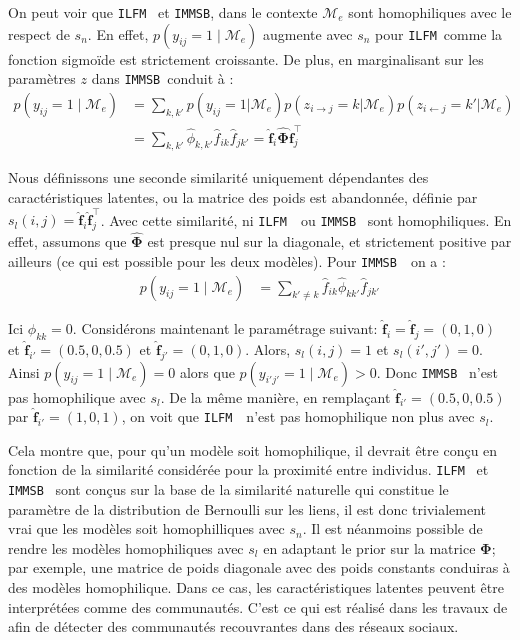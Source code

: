 \documentclass[french]{hermes-journal}
\newcommand{\ilfm}{\texttt{ILFM}}
\newcommand{\immsb}{\texttt{IMMSB}}
\newcommand{\pr}{p}
\newcommand{\M}{\mathcal{M}}
\newcommand{\mat}[1]{\bm{#1}}
\begin{document}
On peut voir que \ilfm~  et \immsb, dans le contexte $\mathcal{M}_e$ sont homophiliques avec le respect de $s_n$. En effet, $\pr(y_{ij}=1 \mid \mathcal{M}_e)$ augmente avec $s_n$  pour  \ilfm\ comme la fonction sigmoïde est strictement croissante. De plus, en marginalisant sur les paramètres $z$ dans \immsb\ conduit à :
\begin{align}
    \pr(y_{ij} =1 \mid \mathcal{M}_e) & = \sum_{k,k'} \pr(y_{ij}=1|\mathcal{M}_e) \pr(z_{i \rightarrow j}=k | \mathcal{M}_e) \pr(z_{i \leftarrow j}=k' | \mathcal{M}_e) \nonumber \\
& = \sum_{k,k'} \hat{\phi}_{k,k'} \hat{f}_{ik} \hat{f}_{jk'} = \mat{\hat{f}}_{i} \mat{\hat{\Phi}} \mat{\hat{f}}_j^\top \nonumber
\end{align}


Nous définissons une seconde similarité uniquement dépendantes des caractéristiques latentes, ou la matrice des poids est abandonnée, définie par $s_l(i,j) = \mat{\hat{f}}_{i} \mat{\hat{f}}_j^\top$. Avec cette similarité, ni \ilfm~ ou \immsb~ sont homophiliques. En effet, assumons que $\mat{\hat{\Phi}}$ est presque nul sur la diagonale, et strictement positive par ailleurs (ce qui est possible pour les deux modèles). Pour \immsb~ on a :
\begin{align*} 
\pr(y_{ij}=1 \mid \M_e) & = \sum_{k' \neq k} \hat{f}_{ik} \hat{\phi}_{kk'} \hat{f}_{jk'}
\end{align*}


Ici $\hat{\phi}_{kk} = 0$.  Considérons maintenant le paramétrage suivant: $\mat{\hat{f}}_i=\mat{\hat{f}}_j=(0,1,0)$ et $\mat{\hat{f}}_{i'}=(0.5,0,0.5)$ et $\mat{\hat{f}}_{j'}=(0,1,0)$. Alors, $s_l(i,j)=1$ et $s_l(i',j')=0$. Ainsi $\pr(y_{ij}=1 \mid \M_e) = 0$ alors que $\pr(y_{i'j'}=1 \mid \M_e) > 0$. Donc \immsb~ n'est pas homophilique avec $s_l$. De la même manière, en remplaçant $\mat{\hat{f}}_{i'}=(0.5,0,0. 5)$ par $\mat{\hat{f}}_{i'}=(1,0,1)$, on voit que \ilfm~ n'est pas homophilique non plus avec $s_l$.

Cela montre que, pour qu'un modèle soit homophilique, il devrait être conçu en fonction de la similarité considérée pour la proximité entre individus. \ilfm~ et \immsb~ sont conçus sur la base de la similarité naturelle qui constitue le paramètre de la distribution de Bernoulli sur les liens, il est donc trivialement vrai que les modèles soit homophilliques avec $s_n$. Il est néanmoins possible de rendre les modèles homophiliques avec $s_l$ en adaptant le prior sur la matrice $\mat{\Phi}$; par exemple, une matrice de poids diagonale avec des poids constants conduiras à des modèles homophilique. Dans ce cas, les caractéristiques latentes peuvent être interprétées comme des communautés. C'est ce qui est réalisé dans les travaux de \cite{AMMSB} afin de détecter des communautés recouvrantes dans des réseaux sociaux.
\end{document}
